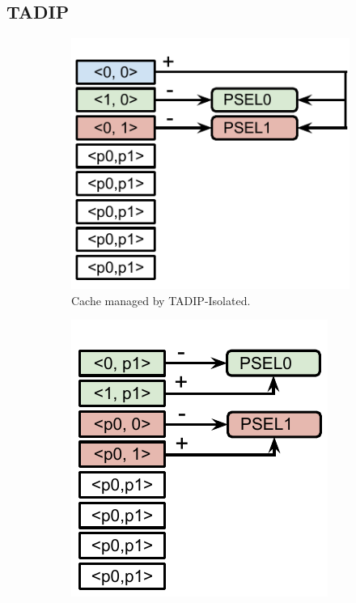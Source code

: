 \subsection{TADIP}
\label{sec:algorithms:tadip}

\begin{figure}[H]
    \centering
    \begin{subfigure}[b]{0.5\textwidth}
        \includegraphics[width=\textwidth]{figures/algorithms/TADIP-I}
        \caption{Cache managed by TADIP-Isolated.}
        \label{fig:algorithms:tadip:isolated}
    \end{subfigure}
    \begin{subfigure}[b]{0.5\textwidth}
        \includegraphics[width=\textwidth]{figures/algorithms/TADIP-F}

\end{subfigure}
\end{figure}
